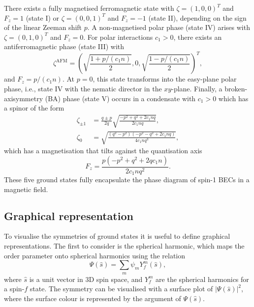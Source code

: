 There exists a fully magnetised ferromagnetic state with \(\zeta={(1, 0, 0)}^T\)
and \(F_z=1\) (state I) or \(\zeta={(0, 0, 1)}^T\) and \(F_z=-1\) (state II),
depending on the sign of the linear Zeeman shift \(p\).
A non-magnetised polar phase (state IV) arises with \(\zeta={(0, 1, 0)}^T\) and
\(F_z = 0\).
For polar interactions \(c_1 > 0\), there exists an antiferromagnetic phase
(state III) with
\begin{equation}\label{eq: AFM-spinor}
    \zeta^\mathrm{AFM} = {\left(\sqrt{\frac{1 + p/(c_1n)}{2}}, 0,
    \sqrt{\frac{1 - p/(c_1n)}{2}}\right)}^T,
\end{equation}
and \(F_z = p/(c_1n)\).
At \(p=0\), this state transforms into the easy-plane polar phase, i.e., state
IV with the nematic director in the \(xy\)-plane.
Finally, a broken-axisymmetry (BA) phase (state V) occurs in a condensate with
\(c_1 > 0\) which has a spinor of the form
\begin{equation}
    \begin{aligned}
        \zeta_{\pm 1} & =
        \frac{q \pm p}{2q}\sqrt{\frac{-p^2+q^2+2c_1nq}{2c_1nq}},              \\
        \zeta_0       & = \sqrt{\frac{(q^2-p^2)(-p^2-q^2+2c_1nq)}{4c_1nq^3}},
    \end{aligned}
    \label{eq: BA-spinor}
\end{equation}
which has a magnetisation that tilts against the quantisation axis
\begin{equation}
    F_z = \frac{p(-p^2 + q^2 + 2qc_1n)}{2c_1nq^2}.
\end{equation}
These five ground states fully encapsulate the phase diagram of spin-1 BECs
in a magnetic field.

\subsection{Graphical representation}
To visualise the symmetries of ground states it is useful to define graphical
representations.
The first to consider is the spherical harmonic, which maps the order parameter
onto spherical harmonics using the relation
\begin{equation}
    \Psi(\hat{s}) = \sum_m\psi_m Y_f^m(\hat{s}),
    \label{eq: spherical-harmonics}
\end{equation}
where \(\hat{s}\) is a unit vector in 3D spin space, and \(Y_f^m \) are the
spherical harmonics for a spin-\(f\) state.
The symmetry can be visualised with a surface plot of \(|\Psi(\hat{s})|^2\),
where the surface colour is represented by the argument of \(\Psi(\hat{s})\).

